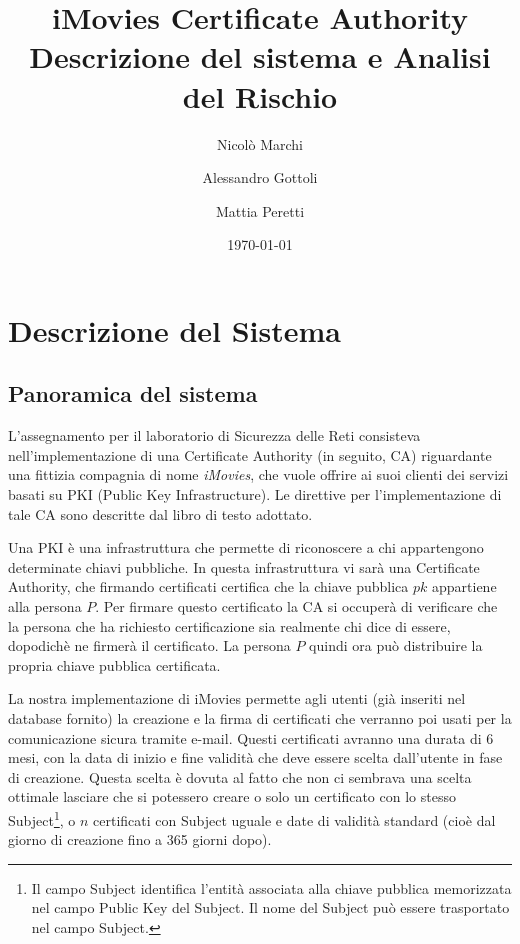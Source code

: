 \documentclass{article}
\title{\huge\sffamily\bfseries iMovies Certificate Authority {\huge\sffamily\bfseries Descrizione del sistema e Analisi del Rischio}}
\author{Nicolò Marchi \and Alessandro Gottoli \and Mattia Peretti}
\date{\today}
\begin{document}
\maketitle

\tableofcontents
\listoffigures
\pagebreak


\section{Descrizione del Sistema}

\subsection{Panoramica del sistema}

L'assegnamento per il laboratorio di Sicurezza delle Reti consisteva nell'implementazione di una Certificate Authority (in seguito, CA) riguardante una fittizia compagnia di nome \emph{iMovies}, che vuole offrire ai suoi clienti dei servizi basati su PKI (Public Key Infrastructure).
Le direttive per l'implementazione di tale CA sono descritte dal libro di testo \cite{applied security} adottato.

Una PKI è una infrastruttura che permette di riconoscere a chi appartengono determinate chiavi pubbliche. In questa infrastruttura vi sarà una Certificate Authority, che firmando certificati certifica che la chiave pubblica $pk$ appartiene alla persona $P$.
Per firmare questo certificato la CA si occuperà di verificare che la persona che ha richiesto certificazione sia realmente chi dice di essere, dopodichè ne firmerà il certificato.
La persona $P$ quindi ora può distribuire la propria chiave pubblica certificata.

La nostra implementazione di iMovies permette agli utenti (già inseriti nel database fornito) la creazione e la firma di certificati che verranno poi usati per la comunicazione sicura tramite e-mail.
Questi certificati avranno una durata di 6 mesi, con la data di inizio e fine validità che deve essere scelta dall'utente in fase di creazione. Questa scelta è dovuta al fatto che non ci sembrava una scelta ottimale lasciare che si potessero creare o solo un certificato con lo stesso Subject\footnote{Il campo Subject identifica l'entità associata alla chiave pubblica memorizzata nel campo Public Key del Subject. Il nome del Subject può essere trasportato nel campo Subject.}, o $n$ certificati con Subject uguale e date di validità standard (cioè dal giorno di creazione fino a 365 giorni dopo).
\end{document}
